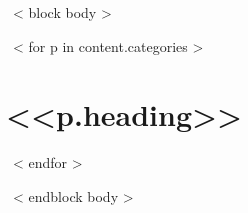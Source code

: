 
~< block body >~

\renewcommand*{\bibfont}{\small}


~< for p in content.categories >~


\section{\sc <<p.heading>>}
\begin{refsection}
\nocite{*}
\printbibliography[heading=none]
\end{refsection}

~< endfor >~

~< endblock body >~